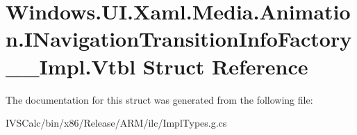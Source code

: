 \hypertarget{struct_windows_1_1_u_i_1_1_xaml_1_1_media_1_1_animation_1_1_i_navigation_transition_info_factory_____impl_1_1_vtbl}{}\section{Windows.\+U\+I.\+Xaml.\+Media.\+Animation.\+I\+Navigation\+Transition\+Info\+Factory\+\_\+\+\_\+\+Impl.\+Vtbl Struct Reference}
\label{struct_windows_1_1_u_i_1_1_xaml_1_1_media_1_1_animation_1_1_i_navigation_transition_info_factory_____impl_1_1_vtbl}


The documentation for this struct was generated from the following file\+:\begin{DoxyCompactItemize}
\item 
I\+V\+S\+Calc/bin/x86/\+Release/\+A\+R\+M/ilc/Impl\+Types.\+g.\+cs\end{DoxyCompactItemize}
